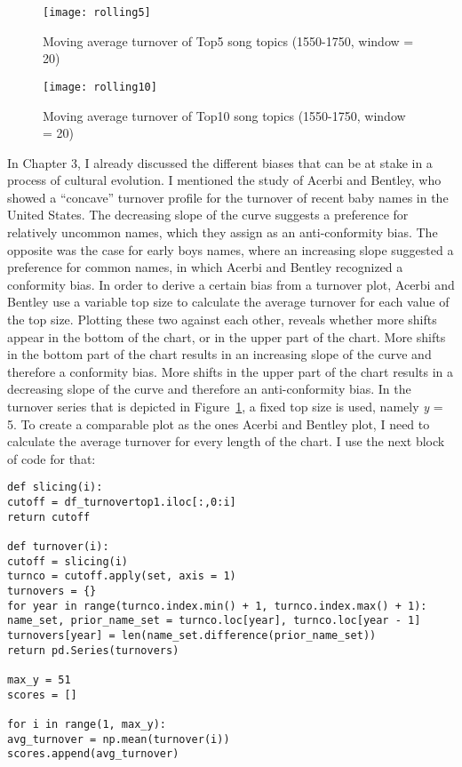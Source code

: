 \begin{figure}[hbt!]
	\centering
	\texttt{[image: rolling5]}
	\caption{Moving average turnover of Top5 song topics (1550-1750, window = 20)}
	\label{fig:rolling5}
\end{figure}

\begin{figure}[hbt!]
	\centering
	\texttt{[image: rolling10]}
	\caption{Moving average turnover of Top10 song topics (1550-1750, window = 20)}
	\label{fig:rolling10}
\end{figure}

In Chapter 3, I already discussed the different biases that can be at stake in a process of cultural evolution. I mentioned the study of Acerbi and Bentley, who showed a \enquote{concave} turnover profile for the turnover of recent baby names in the United States. The decreasing slope of the curve suggests a preference for relatively uncommon names, which they assign as an anti-conformity bias. The opposite was the case for early boys names, where an increasing slope suggested a preference for common names, in which Acerbi and Bentley recognized a conformity bias. In order to derive a certain bias from a turnover plot, Acerbi and Bentley use a variable top size to calculate the average turnover for each value of the top size. Plotting these two against each other, reveals whether more shifts appear in the bottom of the chart, or in the upper part of the chart. More shifts in the bottom part of the chart results in an increasing slope of the curve and therefore a conformity bias. More shifts in the upper part of the chart results in a decreasing slope of the curve and therefore an anti-conformity bias. In the turnover series that is depicted in Figure~\ref{fig:rolling5}, a fixed top size is used, namely \textit{y} = 5. To create a comparable plot as the ones Acerbi and Bentley plot, I need to calculate the average turnover for every length of the chart. I use the next block of code for that:

\begin{lstlisting}
def slicing(i):
cutoff = df_turnovertop1.iloc[:,0:i]
return cutoff

def turnover(i):
cutoff = slicing(i)
turnco = cutoff.apply(set, axis = 1)
turnovers = {}
for year in range(turnco.index.min() + 1, turnco.index.max() + 1):
name_set, prior_name_set = turnco.loc[year], turnco.loc[year - 1]
turnovers[year] = len(name_set.difference(prior_name_set))
return pd.Series(turnovers)

max_y = 51 
scores = []

for i in range(1, max_y):
avg_turnover = np.mean(turnover(i))
scores.append(avg_turnover)
\end{lstlisting}

